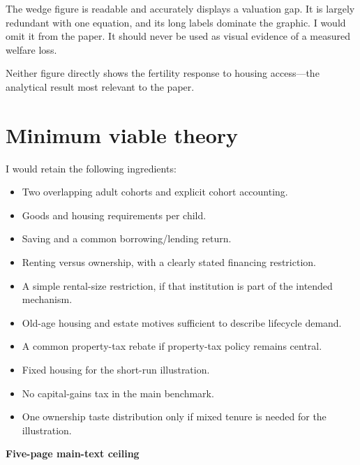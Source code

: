 \documentclass[11pt,letterpaper]{article}
\providecommand{\tightlist}{\setlength{\itemsep}{0.25em}\setlength{\parskip}{0pt}}
\begin{document}
The wedge figure is readable and accurately displays a valuation gap. It is largely
redundant with one equation, and its long labels dominate the graphic. I would omit it
from the paper. It should never be used as visual evidence of a measured welfare loss.

Neither figure directly shows the fertility response to housing access---the analytical
result most relevant to the paper.

\section{Minimum viable theory}\label{minimum-viable-theory}

I would retain the following ingredients:

\begin{itemize}
\tightlist
\item
  Two overlapping adult cohorts and explicit cohort accounting.
\item
  Goods and housing requirements per child.
\item
  Saving and a common borrowing/lending return.
\item
  Renting versus ownership, with a clearly stated financing restriction.
\item
  A simple rental-size restriction, if that institution is part of the intended mechanism.
\item
  Old-age housing and estate motives sufficient to describe lifecycle demand.
\item
  A common property-tax rebate if property-tax policy remains central.
\item
  Fixed housing for the short-run illustration.
\item
  No capital-gains tax in the main benchmark.
\item
  One ownership taste distribution only if mixed tenure is needed for the illustration.
\end{itemize}

\textbf{Five-page main-text ceiling}

\begingroup\small\setlength{\tabcolsep}{5pt}\renewcommand{\arraystretch}{1.17}
\end{document}
